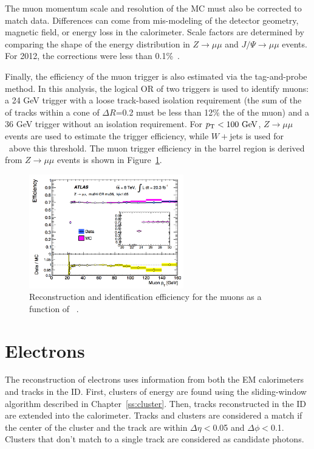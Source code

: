 The muon momentum scale and resolution of the MC must also be corrected to match data. Differences can come from mis-modeling of the detector geometry, magnetic field, or energy loss in the calorimeter. Scale factors are determined by comparing the shape of the energy distribution in $Z\rightarrow \mu\mu$ and $J/\Psi\rightarrow \mu\mu$ events. For 2012, the corrections were less than 0.1\%~\cite{muonpaper}.

Finally, the efficiency of the muon trigger is also estimated via the tag-and-probe method. In this analysis, the logical OR of two triggers is used to identify muons: a 24 GeV trigger with a loose track-based isolation requirement (the sum of the \pt of tracks within a cone of $\Delta R$=0.2 must be less than 12\% the \pt of the muon) and a 36 GeV trigger without an isolation requirement. For $\pt<100 \gev$, $Z\rightarrow\mu\mu$ events are used to estimate the trigger efficiency, while $W+$jets is used for \pt\ above this threshold. The muon trigger efficiency in the barrel region is derived from $Z\rightarrow\mu\mu$ events is shown in Figure~\ref{fig:muontrigger}.

\begin{figure}[hp]
\centering
\includegraphics[width=0.6\textwidth]{fig/obj/muontrigger.png}
\caption{Reconstruction and identification efficiency for the muons as a function of \pt~\cite{Aad:2014fxa}.}
\label{fig:muontrigger}
\end{figure}

\section{Electrons}
The reconstruction of electrons uses information from both the EM calorimeters and tracks in the ID. First, clusters of energy are found using the sliding-window algorithm described in Chapter~\ref{ss:cluster}. Then, tracks reconstructed in the ID are extended into the calorimeter. Tracks and clusters are considered a match if the center of the cluster and the track are within $\Delta\eta<$0.05 and $\Delta\phi<$0.1. Clusters that don't match to a single track are considered as candidate photons. 

